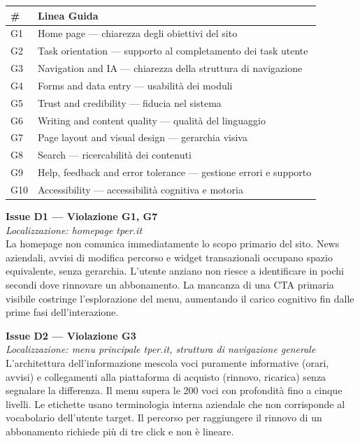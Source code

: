\documentclass[11pt,a4paper]{article}
\begin{document}
\begin{tabular}{ll}
\hline
\textbf{\#} & \textbf{Linea Guida} \\
\hline
G1 & Home page — chiarezza degli obiettivi del sito \\
G2 & Task orientation — supporto al completamento dei task utente \\
G3 & Navigation and IA — chiarezza della struttura di navigazione \\
G4 & Forms and data entry — usabilità dei moduli \\
G5 & Trust and credibility — fiducia nel sistema \\
G6 & Writing and content quality — qualità del linguaggio \\
G7 & Page layout and visual design — gerarchia visiva \\
G8 & Search — ricercabilità dei contenuti \\
G9 & Help, feedback and error tolerance — gestione errori e supporto \\
G10 & Accessibility — accessibilità cognitiva e motoria \\
\hline
\end{tabular}

\bigskip

\noindent\textbf{Issue D1 — Violazione G1, G7}\label{iss:D1}\\
\textit{Localizzazione: homepage tper.it}\\

\noindent La homepage non comunica immediatamente lo scopo primario del
sito. News aziendali, avvisi di modifica percorso e widget transazionali
occupano spazio equivalente, senza gerarchia. L'utente anziano non riesce
a identificare in pochi secondi dove rinnovare un abbonamento. La mancanza
di una CTA primaria visibile costringe l'esplorazione del menu, aumentando
il carico cognitivo fin dalle prime fasi dell'interazione.

\bigskip

\noindent\textbf{Issue D2 — Violazione G3}\label{iss:D2}\\
\textit{Localizzazione: menu principale tper.it, struttura di navigazione generale}\\

\noindent L'architettura dell'informazione mescola voci puramente
informative (orari, avvisi) e collegamenti alla piattaforma di acquisto
(rinnovo, ricarica) senza segnalare la differenza. Il menu supera le 200
voci con profondità fino a cinque livelli. Le etichette usano terminologia
interna aziendale che non corrisponde al vocabolario dell'utente target.
Il percorso per raggiungere il rinnovo di un abbonamento richiede più
di tre click e non è lineare.
\end{document}
